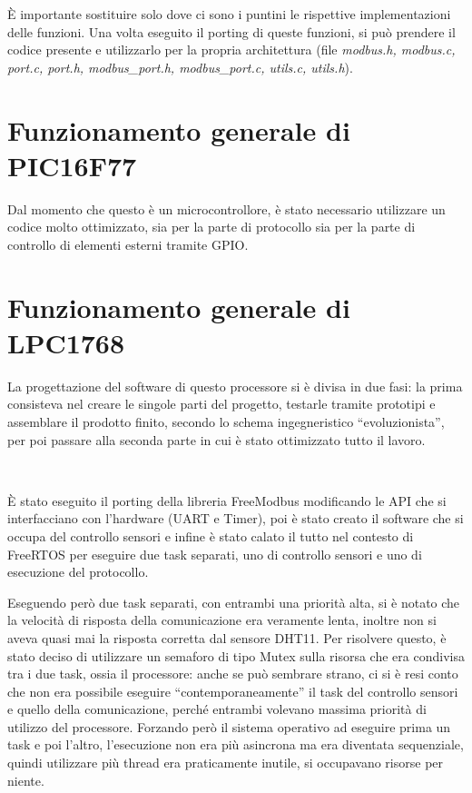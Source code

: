 \documentclass[a4paper,titlepage]{book}
\begin{document}
È importante sostituire solo dove ci sono i puntini le rispettive implementazioni delle funzioni. Una volta eseguito il porting di queste funzioni, si può prendere il codice presente e utilizzarlo per la propria architettura (file \textit{modbus.h, modbus.c, port.c, port.h, modbus\_port.h, modbus\_port.c, utils.c, utils.h}).


\section{Funzionamento generale di PIC16F77}

Dal momento che questo è un microcontrollore, è stato necessario utilizzare un codice molto ottimizzato, sia per la parte di protocollo sia per la parte di controllo di elementi esterni tramite GPIO.

\section{Funzionamento generale di LPC1768}

La progettazione del software di questo processore si è divisa in due fasi: la prima consisteva nel creare le singole parti del progetto, testarle tramite prototipi e assemblare il prodotto finito, secondo lo schema ingegneristico ``evoluzionista'', per poi passare alla seconda parte in cui è stato ottimizzato tutto il lavoro.

~

È stato eseguito il porting della libreria FreeModbus modificando le API che si interfacciano con l'hardware (UART e Timer), poi è stato creato il software che si occupa del controllo sensori e infine è stato calato il tutto nel contesto di FreeRTOS per eseguire due task separati, uno di controllo sensori e uno di esecuzione del protocollo.

Eseguendo però due task separati, con entrambi una priorità alta, si è notato che la velocità di risposta della comunicazione era veramente lenta, inoltre non si aveva quasi mai la risposta corretta dal sensore DHT11. Per risolvere questo, è stato deciso di utilizzare un semaforo di tipo Mutex sulla risorsa che era condivisa tra i due task, ossia il processore: anche se può sembrare strano, ci si è resi conto che non era possibile eseguire ``contemporaneamente'' il task del controllo sensori e quello della comunicazione, perché entrambi volevano massima priorità di utilizzo del processore. Forzando però il sistema operativo ad eseguire prima un task e poi l'altro, l'esecuzione non era più asincrona ma era diventata sequenziale, quindi utilizzare più thread era praticamente inutile, si occupavano risorse per niente.
\end{document}
